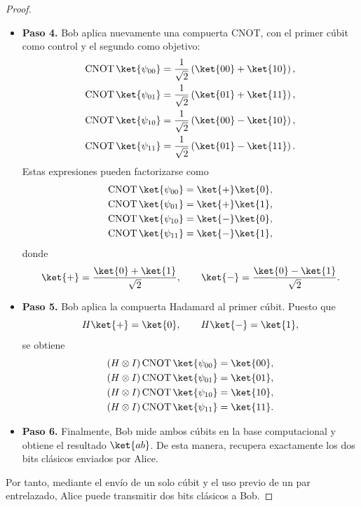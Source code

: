 \documentclass[a4,10pt]{aleph-notas}
\begin{document}
\begin{proof}
\begin{itemize}
        \item \textbf{Paso 4.} Bob aplica nuevamente una compuerta CNOT, con el
        primer cúbit como control y el segundo como objetivo:
        \begin{align*}
            \operatorname{CNOT}\ket{\psi_{00}}
            &=
            \frac{1}{\sqrt{2}}
            \left(\ket{00}+\ket{10}\right),\\
            \operatorname{CNOT}\ket{\psi_{01}}
            &=
            \frac{1}{\sqrt{2}}
            \left(\ket{01}+\ket{11}\right),\\
            \operatorname{CNOT}\ket{\psi_{10}}
            &=
            \frac{1}{\sqrt{2}}
            \left(\ket{00}-\ket{10}\right),\\
            \operatorname{CNOT}\ket{\psi_{11}}
            &=
            \frac{1}{\sqrt{2}}
            \left(\ket{01}-\ket{11}\right).
        \end{align*}
        Estas expresiones pueden factorizarse como
        \begin{align*}
            \operatorname{CNOT}\ket{\psi_{00}}
            &=\ket{+}\ket{0},\\
            \operatorname{CNOT}\ket{\psi_{01}}
            &=\ket{+}\ket{1},\\
            \operatorname{CNOT}\ket{\psi_{10}}
            &=\ket{-}\ket{0},\\
            \operatorname{CNOT}\ket{\psi_{11}}
            &=\ket{-}\ket{1},
        \end{align*}
        donde
        \[
            \ket{+}
            =
            \frac{\ket{0}+\ket{1}}{\sqrt{2}},
            \qquad
            \ket{-}
            =
            \frac{\ket{0}-\ket{1}}{\sqrt{2}}.
        \]

        \item \textbf{Paso 5.} Bob aplica la compuerta Hadamard al primer cúbit.
        Puesto que
        \[
            H\ket{+}=\ket{0},
            \qquad
            H\ket{-}=\ket{1},
        \]
        se obtiene
        \begin{align*}
            (H\otimes I)\operatorname{CNOT}\ket{\psi_{00}}
            &=\ket{00},\\
            (H\otimes I)\operatorname{CNOT}\ket{\psi_{01}}
            &=\ket{01},\\
            (H\otimes I)\operatorname{CNOT}\ket{\psi_{10}}
            &=\ket{10},\\
            (H\otimes I)\operatorname{CNOT}\ket{\psi_{11}}
            &=\ket{11}.
        \end{align*}

        \item \textbf{Paso 6.} Finalmente, Bob mide ambos cúbits en la base computacional y obtiene el resultado \(\ket{ab}\). De esta manera, recupera exactamente los dos bits clásicos enviados por Alice.
    \end{itemize}

    Por tanto, mediante el envío de un solo cúbit y el uso previo de un par
    entrelazado, Alice puede transmitir dos bits clásicos a Bob.
\end{proof}
\end{document}
